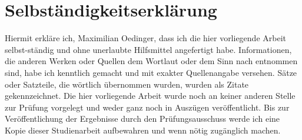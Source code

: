 \section*{Selbständigkeitserklärung}
Hiermit erkläre ich, Maximilian Oedinger, dass ich die hier vorliegende Arbeit selbst-ständig und ohne unerlaubte Hilfsmittel angefertigt habe. Informationen, die
anderen Werken oder Quellen dem Wortlaut oder dem Sinn nach entnommen sind, habe ich kenntlich gemacht und mit exakter Quellenangabe
versehen. Sätze oder Satzteile, die wörtlich übernommen wurden, wurden
als Zitate gekennzeichnet. Die hier vorliegende Arbeit wurde noch an
keiner anderen Stelle zur Prüfung vorgelegt und weder ganz noch in
Auszügen veröffentlicht. Bis zur Veröffentlichung der Ergebnisse durch den
Prüfungsausschuss werde ich eine Kopie dieser Studienarbeit aufbewahren und wenn nötig zugänglich machen.